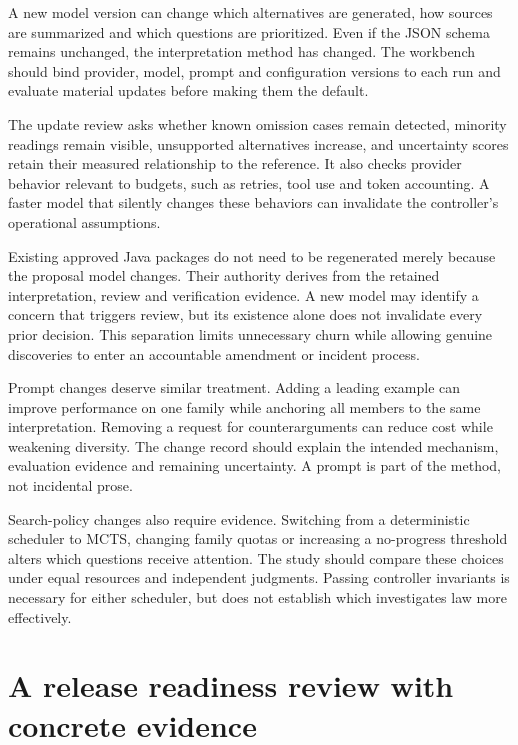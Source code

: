 A new model version can change which alternatives are generated, how sources are
summarized and which questions are prioritized. Even if the JSON schema remains
unchanged, the interpretation method has changed. The workbench should bind
provider, model, prompt and configuration versions to each run and evaluate
material updates before making them the default.

The update review asks whether known omission cases remain detected, minority
readings remain visible, unsupported alternatives increase, and uncertainty scores
retain their measured relationship to the reference. It also checks provider
behavior relevant to budgets, such as retries, tool use and token accounting.
A faster model that silently changes these behaviors can invalidate the
controller's operational assumptions.


Existing approved Java packages do not need to be regenerated merely because the
proposal model changes. Their authority derives from the retained interpretation,
review and verification evidence. A new model may identify a concern that triggers
review, but its existence alone does not invalidate every prior decision. This
separation limits unnecessary churn while allowing genuine discoveries to enter
an accountable amendment or incident process.

Prompt changes deserve similar treatment. Adding a leading example can improve
performance on one family while anchoring all members to the same interpretation.
Removing a request for counterarguments can reduce cost while weakening diversity.
The change record should explain the intended mechanism, evaluation evidence and
remaining uncertainty. A prompt is part of the method, not incidental prose.

Search-policy changes also require evidence. Switching from a deterministic
scheduler to MCTS, changing family quotas or increasing a no-progress threshold
alters which questions receive attention. The study should compare these choices
under equal resources and independent judgments. Passing controller invariants
is necessary for either scheduler, but does not establish which investigates law
more effectively.

\section{A release readiness review with concrete evidence}
\label{merge:M10:11}


